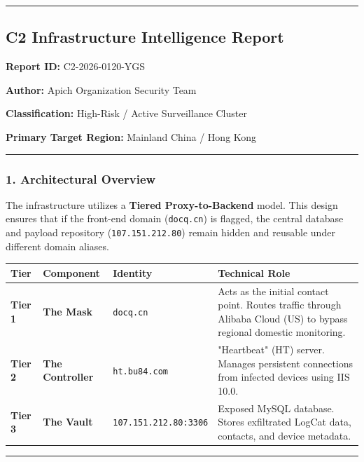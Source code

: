 \documentclass[
]{article}
\begin{document}
\begin{center}\rule{0.5\linewidth}{0.5pt}\end{center}

\subsection{C2 Infrastructure Intelligence
Report}\label{c2-infrastructure-intelligence-report-2}

\textbf{Report ID:} C2-2026-0120-YGS

\textbf{Author:} Apich Organization Security Team

\textbf{Classification:} High-Risk / Active Surveillance Cluster

\textbf{Primary Target Region:} Mainland China / Hong Kong

\begin{center}\rule{0.5\linewidth}{0.5pt}\end{center}

\subsubsection{1. Architectural
Overview}\label{1-architectural-overview-2}

The infrastructure utilizes a \textbf{Tiered Proxy-to-Backend} model.
This design ensures that if the front-end domain (\texttt{docq.cn}) is
flagged, the central database and payload repository
(\texttt{107.151.212.80}) remain hidden and reusable under different
domain aliases.

\begin{longtable}[]{@{}llll@{}}
\toprule\noalign{}
Tier & Component & Identity & Technical Role \\
\midrule\noalign{}
\endhead
\bottomrule\noalign{}
\endlastfoot
\textbf{Tier 1} & \textbf{The Mask} & \texttt{docq.cn} & Acts as the
initial contact point. Routes traffic through Alibaba Cloud (US) to
bypass regional domestic monitoring. \\
\textbf{Tier 2} & \textbf{The Controller} & \texttt{ht.bu84.com} &
"Heartbeat" (HT) server. Manages persistent connections from infected
devices using IIS 10.0. \\
\textbf{Tier 3} & \textbf{The Vault} & \texttt{107.151.212.80:3306} &
Exposed MySQL database. Stores exfiltrated LogCat data, contacts, and
device metadata. \\
\end{longtable}

\begin{center}\rule{0.5\linewidth}{0.5pt}\end{center}
\end{document}
